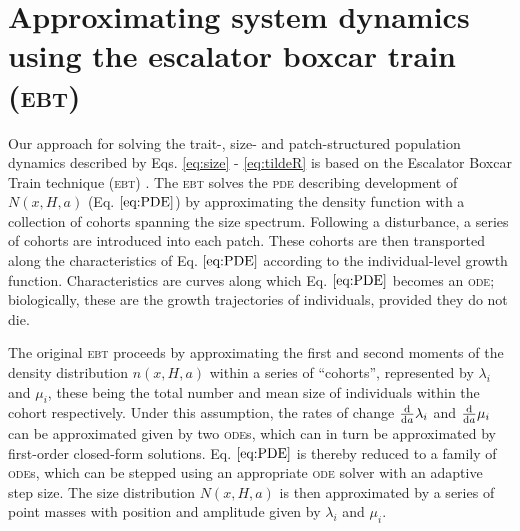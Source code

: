 \documentclass[10pt,twoside]{article}
\begin{document}
\section{Approximating system dynamics using the escalator boxcar train
(\textsc{ebt})}\label{approximating-system-dynamics-using-the-escalator-boxcar-train-ebt}

Our approach for solving the trait-, size- and patch-structured
population dynamics described by Eqs. \ref{eq:size} - \ref{eq:tildeR} is
based on the Escalator Boxcar Train technique (\textsc{ebt})
\citep{Deroos-1997, Deroos-1992, Deroos-1988}. The \textsc{ebt} solves the \textsc{pde}
describing development of \(N(x, H, a)\) (Eq. \(\ref{eq:PDE}\)) by
approximating the density function with a collection of cohorts spanning
the size spectrum. Following a disturbance, a series of cohorts are
introduced into each patch. These cohorts are then transported along the
characteristics of Eq. \(\ref{eq:PDE}\) according to the
individual-level growth function. Characteristics are curves along which
Eq. \(\ref{eq:PDE}\) becomes an \textsc{ode};
biologically, these are the growth trajectories of individuals, provided
they do not die.

The original \textsc{ebt} \citep{Deroos-1997, Deroos-1992, Deroos-1988} proceeds
by approximating the first and second moments of the density
distribution \(n \left(x, H, a \right)\) within a series of ``cohorts'',
represented by \(\lambda_i\) and \(\mu_i\), these being the total number
and mean size of individuals within the cohort respectively. Under this
assumption, the rates of change \(\frac{\rm d} {{\rm d}a} \lambda_i\)
and \(\frac{\rm d} {{\rm d}a} \mu_i\) can be approximated given by two
\textsc{ode}s, which can in turn be approximated by first-order closed-form
solutions. Eq. \(\ref{eq:PDE}\) is thereby reduced to a family of \textsc{ode}s,
which can be stepped using an appropriate \textsc{ode} solver with an adaptive
step size. The size distribution \(N(x, H, a)\) is then approximated by a
series of point masses with position and amplitude given by
\(\lambda_i\) and \(\mu_i\).
\end{document}
